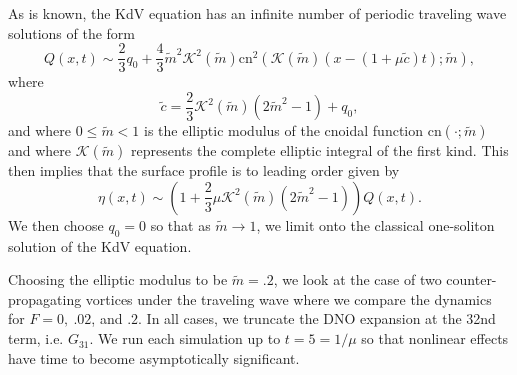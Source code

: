\documentclass[a4paper,11pt]{article}
\begin{document}
As is known, the KdV equation has an infinite number of periodic traveling wave solutions of the form 
\[
Q(x,t) \sim \frac{2}{3}q_{0} + \frac{4}{3} \tilde{m}^{2}\mathcal{K}^2(\tilde{m})\mbox{cn}^{2}\left(\mathcal{K}(\tilde{m}) \left( x- \left(1 + \mu \tilde{c}\right)t\right);\tilde{m}\right),
\]
where
\[
\tilde{c} = \frac{2}{3}\mathcal{K}^{2}(\tilde{m}) (2\tilde{m}^{2}-1)+q_{0},
\]
and where $0\leq \tilde{m}<1$ is the elliptic modulus of the cnoidal function $\mbox{cn}(\cdot;\tilde{m})$ and where $\mathcal{K}(\tilde{m})$ represents the complete elliptic integral of the first kind.  This then implies that the surface profile is to leading order given by 
\[
\eta(x,t) \sim \left(1+\frac{2}{3}\mu \mathcal{K}^{2}(\tilde{m})(2\tilde{m}^{2}-1)\right)Q(x,t).
\]
We then choose $q_{0}=0$ so that as $\tilde{m}\rightarrow 1$, we limit onto the classical one-soliton solution of the KdV equation.  

Choosing the elliptic modulus to be $\tilde{m}=.2$, we look at the case of two counter-propagating vortices under the traveling wave where we compare the dynamics for $F=0, ~.02$, and $.2$.  In all cases, we truncate the DNO expansion at the 32nd term, i.e. $G_{31}$.  We run each simulation up to $t=5=1/\mu$ so that nonlinear effects have time to become asymptotically significant.      
\end{document}
